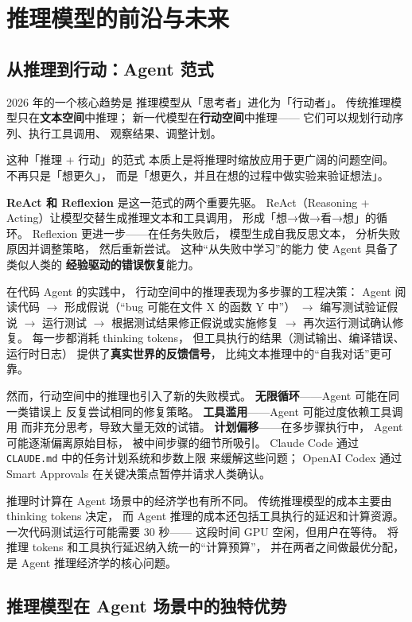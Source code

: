 \section{推理模型的前沿与未来}

\subsection{从推理到行动：Agent 范式}

2026 年的一个核心趋势是
推理模型从「思考者」进化为「行动者」。
传统推理模型只在\textbf{文本空间}中推理；
新一代模型在\textbf{行动空间}中推理——
它们可以规划行动序列、执行工具调用、
观察结果、调整计划。

这种「推理 + 行动」的范式
本质上是将推理时缩放应用于更广阔的问题空间。
不再只是「想更久」，
而是「想更久，并且在想的过程中做实验来验证想法」。

\textbf{ReAct 和 Reflexion} 是这一范式的两个重要先驱。
ReAct（Reasoning + Acting）让模型交替生成推理文本和工具调用，
形成「想→做→看→想」的循环。
Reflexion 更进一步——在任务失败后，
模型生成自我反思文本，
分析失败原因并调整策略，
然后重新尝试。
这种“从失败中学习”的能力
使 Agent 具备了类似人类的
\textbf{经验驱动的错误恢复}能力。

在代码 Agent 的实践中，
行动空间中的推理表现为多步骤的工程决策：
Agent 阅读代码 $\to$ 形成假说（“bug 可能在文件 X 的函数 Y 中”）
$\to$ 编写测试验证假说 $\to$ 运行测试
$\to$ 根据测试结果修正假说或实施修复
$\to$ 再次运行测试确认修复。
每一步都消耗 thinking tokens，
但工具执行的结果（测试输出、编译错误、运行时日志）
提供了\textbf{真实世界的反馈信号}，
比纯文本推理中的“自我对话”更可靠。

然而，行动空间中的推理也引入了新的失败模式。
\textbf{无限循环}——Agent 可能在同一类错误上
反复尝试相同的修复策略。
\textbf{工具滥用}——Agent 可能过度依赖工具调用
而非充分思考，导致大量无效的试错。
\textbf{计划偏移}——在多步骤执行中，
Agent 可能逐渐偏离原始目标，
被中间步骤的细节所吸引。
Claude Code 通过 \texttt{CLAUDE.md}
中的任务计划系统和步数上限
来缓解这些问题；
OpenAI Codex 通过 Smart Approvals
在关键决策点暂停并请求人类确认。

推理时计算在 Agent 场景中的经济学也有所不同。
传统推理模型的成本主要由 thinking tokens 决定，
而 Agent 推理的成本还包括工具执行的延迟和计算资源。
一次代码测试运行可能需要 30 秒——
这段时间 GPU 空闲，但用户在等待。
将推理 tokens 和工具执行延迟纳入统一的“计算预算”，
并在两者之间做最优分配，
是 Agent 推理经济学的核心问题。

\subsection{推理模型在 Agent 场景中的独特优势}

